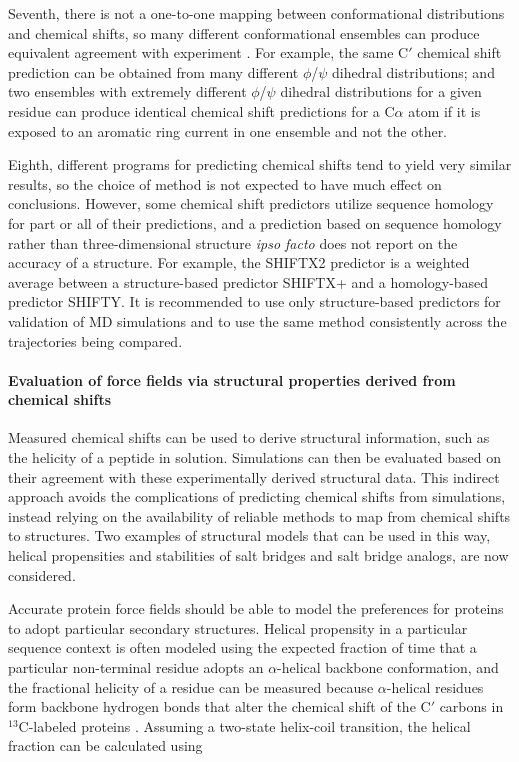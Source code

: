 \documentclass[9pt,review]{livecoms}
\begin{document}
Seventh, there is not a one-to-one mapping between conformational distributions and chemical shifts, so many different conformational ensembles can produce equivalent agreement with experiment \cite{wood_secondary_2011,virtanen_heterogeneous_2020,shrestha_full_2021}.
For example, the same C$'$ chemical shift prediction can be obtained from many different $\phi$/$\psi$ dihedral distributions; and two ensembles with extremely different $\phi$/$\psi$ dihedral distributions for a given residue can produce identical chemical shift predictions for a C$\alpha$ atom if it is exposed to an aromatic ring current in one ensemble and not the other.

Eighth, different programs for predicting chemical shifts tend to yield very similar results, so the choice of method is not expected to have much effect on conclusions.
However, some chemical shift predictors utilize sequence homology for part or all of their predictions, and a prediction based on sequence homology rather than three-dimensional structure \emph{ipso facto} does not report on the accuracy of a structure.
For example, the SHIFTX2 predictor is a weighted average between a structure-based predictor SHIFTX+ and a homology-based predictor SHIFTY.
It is recommended to use only structure-based predictors for validation of MD simulations and to use the same method consistently across the trajectories being compared.

\paragraph{Evaluation of force fields via structural properties derived from chemical shifts}

Measured chemical shifts can be used to derive structural information, such as the helicity of a peptide in solution.
Simulations can then be evaluated based on their agreement with these experimentally derived structural data.
This indirect approach avoids the complications of predicting chemical shifts from simulations, instead relying on the availability of reliable methods to map from chemical shifts to structures.
Two examples of structural models that can be used in this way, helical propensities and stabilities of salt bridges and salt bridge analogs, are now considered.

Accurate protein force fields should be able to model the preferences for proteins to adopt particular secondary structures.
Helical propensity in a particular sequence context is often modeled using the expected fraction of time that a particular non-terminal residue adopts an $\alpha$-helical backbone conformation, and the fractional helicity of a residue can be measured because $\alpha$-helical residues form backbone hydrogen bonds that alter the chemical shift of the C$'$ carbons in $^{13}$C-labeled proteins \cite{shalongo_distribution_1994}.
Assuming a two-state helix-coil transition, the helical fraction can be calculated using
\end{document}
